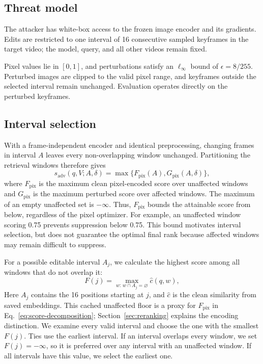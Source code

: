 \documentclass[runningheads]{llncs}
\begin{document}
\subsection{Threat model}

The attacker has white-box access to the frozen image encoder and its gradients. Edits are restricted to one interval of 16 consecutive sampled keyframes in the target video; the model, query, and all other videos remain fixed.

Pixel values lie in $[0,1]$, and perturbations satisfy an $\ell_\infty$ bound of $\epsilon=8/255$. Perturbed images are clipped to the valid pixel range, and keyframes outside the selected interval remain unchanged. Evaluation operates directly on the perturbed keyframes.

\subsection{Interval selection}

With a frame-independent encoder and identical preprocessing, changing frames in interval $A$ leaves every non-overlapping window unchanged. Partitioning the retrieval windows therefore gives
\begin{equation}
s_{\mathrm{adv}}(q,V;A,\delta)=\max\{F_{\mathrm{pix}}(A),G_{\mathrm{pix}}(A,\delta)\},
\label{eq:score-decomposition}
\end{equation}
where $F_{\mathrm{pix}}$ is the maximum clean pixel-encoded score over unaffected windows and $G_{\mathrm{pix}}$ is the maximum perturbed score over affected windows. The maximum of an empty unaffected set is $-\infty$. Thus, $F_{\mathrm{pix}}$ bounds the attainable score from below, regardless of the pixel optimizer. For example, an unaffected window scoring 0.75 prevents suppression below 0.75. This bound motivates interval selection, but does not guarantee the optimal final rank because affected windows may remain difficult to suppress.

For a possible editable interval $A_j$, we calculate the highest score among all windows that do not overlap it:
\begin{equation}
F(j)=\max_{w:\,w\cap A_j=\varnothing}\widehat c(q,w),
\end{equation}
Here $A_j$ contains the 16 positions starting at $j$, and $\widehat c$ is the clean similarity from saved embeddings. This cached unaffected floor is a proxy for $F_{\mathrm{pix}}$ in Eq.~\ref{eq:score-decomposition}; Section~\ref{sec:reranking} explains the encoding distinction. We examine every valid interval and choose the one with the smallest $F(j)$. Ties use the earliest interval. If an interval overlaps every window, we set $F(j)=-\infty$, so it is preferred over any interval with an unaffected window. If all intervals have this value, we select the earliest one.
\end{document}
